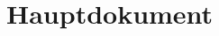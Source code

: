 \documentclass[a4paper, 10pt, fleqn]{article}
\begin{document}
\section{Hauptdokument}
\lipsum[1]


\end{document}
